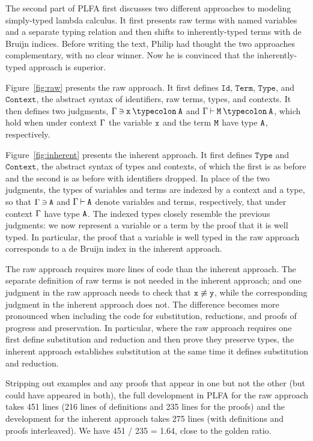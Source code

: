 \documentclass[preprint,authoryear]{elsarticle}
\begin{document}
The second part of PLFA first discusses two different approaches to
modeling simply-typed lambda calculus.  It first presents raw
terms with named variables and a separate typing relation and
then shifts to inherently-typed terms with de Bruijn indices.
Before writing the text, Philip had thought the two approaches
complementary, with no clear winner.  Now he is convinced that the
inherently-typed approach is superior.

Figure~\ref{fig:raw} presents the raw approach.
It first defines $\texttt{Id}$, $\texttt{Term}$,
$\texttt{Type}$, and $\texttt{Context}$, the abstract syntax
of identifiers, raw terms, types, and contexts.
It then defines two judgments,
$\GG\:{\ni}\:\ex\:{\typecolon}\:\AY$ and
$\GG\:{\vdash}\:\EM\:{\typecolon}\:\AY$,
which hold when under context $\Gamma$ the variable $\texttt{x}$
and the term $\texttt{M}$ have type $\texttt{A}$, respectively.

Figure~\ref{fig:inherent} presents the inherent approach.
It first defines $\texttt{Type}$ and $\texttt{Context}$, the abstract syntax
of types and contexts, of which the first is as before and the second is
as before with identifiers dropped.  In place of the two judgments,
the types of variables and terms are indexed by a context and a type,
so that $\Gamma\:{\ni}\:\texttt{A}$ and $\Gamma\:{\vdash}\:\texttt{A}$ denote
variables and terms, respectively, that under context $\Gamma$ have type $\texttt{A}$.
The indexed types closely resemble the previous judgments:
we now represent a variable or a term by the proof that it is well typed.
In particular, the proof that a variable is well typed in the raw approach
corresponds to a de Bruijn index in the inherent approach.

The raw approach requires more lines of code than the inherent approach.  The
separate definition of raw terms is not needed in the inherent approach; and one
judgment in the raw approach needs to check that $\texttt{x} \not\equiv \texttt{y}$, while
the corresponding judgment in the inherent approach does not.  The difference
becomes more pronounced when including the code for substitution, reductions,
and proofs of progress and preservation.  In particular, where the raw approach
requires one first define substitution and reduction and then prove they
preserve types, the inherent approach establishes substitution at the same time
it defines substitution and reduction.

Stripping out examples and any proofs that appear in one but not the other (but
could have appeared in both), the full development in PLFA for the raw approach
takes 451 lines (216 lines of definitions and 235 lines for the proofs) and the
development for the inherent approach takes 275 lines (with definitions and
proofs interleaved).  We have 451 / 235 = 1.64, close to the golden ratio.
\end{document}
